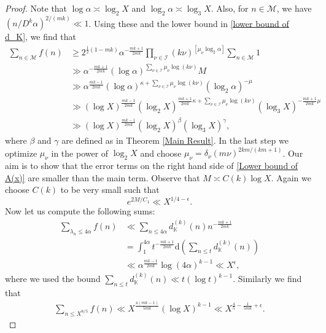 \documentclass[reqno]{amsart}
\numberwithin{equation}{section}
\theoremstyle{plain}
\begin{document}
\begin{proof}
Note that $\log \alpha \asymp \log_2 X$ and $\log_2 \alpha \asymp \log_3 X$. Also, for $n\in \mathcal{M}$, we have $(n/D^k \alpha)^{2/(mk)}\ll 1$. Using these and the lower bound in \eqref{lower bound of d_K}, we find that 
\begin{align} \label{lower bound of sum_ f(n)}
\nonumber	\sum_{n\in \mathcal{M}} f(n) &\geq 2^{\frac{1}{2}(1-mk)} \alpha^{-\frac{mk+1}{2mk}} \prod_{\nu \in \mathcal{I}} (k\nu)^{[\mu_{\nu} \log_2 \alpha]}\sum_{n\in \mathcal{M}}1\\
\nonumber & \gg \alpha^{-\frac{mk+1}{2mk}} (\log \alpha)^{\sum_{\nu \in \mathcal{I}} \mu_{\nu} \log(k\nu)}M\\
\nonumber	& \gg \alpha^{\frac{mk-1}{2mk}} (\log \alpha)^{\kappa+ \sum_{\nu \in \mathcal{I}}\mu_{\nu} \log (k\nu )} (\log_2 \alpha)^{-\mu}\\
\nonumber	& \gg (\log X)^{\frac{mk-1}{2mk}} (\log_2 X)^{\frac{mk+1}{2mk}\kappa + \sum_{\nu \in \mathcal{I}} \mu_{\nu} \log (k\nu) } (\log_3 X)^{-\frac{mk+1}{2mk}\mu}\\
	& \gg (\log X)^{\frac{mk-1}{2mk}} (\log_2 X)^{\beta} (\log_3 X)^{\gamma},
\end{align}
where $\beta$ and $\gamma$ are defined as in  Theorem \ref{Main Result}. In the last step we optimize $\mu_{\nu}$ in the power of $\log_2 X$ and choose $\mu_{\nu}= \delta_{\nu} (m\nu)^{2km/(km+1)}$.
Our aim is  to show that the error terms on the right hand side of \eqref{Lower bound of A(x)} are smaller than the main term. Observe that $M\asymp C(k)\log X$. Again we choose $C(k)$ to be very small such that 
\begin{equation*}
	e^{2M/C_1}\ll X^{1/4-\epsilon}.
\end{equation*}
Now let us compute the following sums:
\begin{align} \label{For error 1}
\nonumber	\sum_{\lambda_n\leq 4\alpha}f(n) &\ll \sum_{n\leq 4\alpha} d_{\mathbb{K}}^{(k)}(n) n^{-\frac{mk+1}{2mk}}\\
\nonumber	&= \int_{1}^{4\alpha} t^{-\frac{mk+1}{2mk}} \mathrm{d}\left(\sum_{n\leq t}d_{\mathbb{K}}^{(k)}(n)\right)\\
	&\ll \alpha^{\frac{mk-1}{2mk}} \log(4 \alpha)^{k-1} \ll X^{\epsilon},
\end{align}
where we used the bound $\sum_{n\leq t} d_{\mathbb{K}}^{(k)}(n) \ll t(\log t)^{k-1}$. Similarly we find that
\begin{align} \label{for error 2}
	\sum_{n\leq X^{8/5}} f(n) \ll X^{\frac{4(mk-1)}{5mk}} (\log X)^{k-1} \ll X^{\frac{4}{5}- \frac{1}{5mk} +\epsilon}.

\end{align}
\end{proof}
\end{document}
